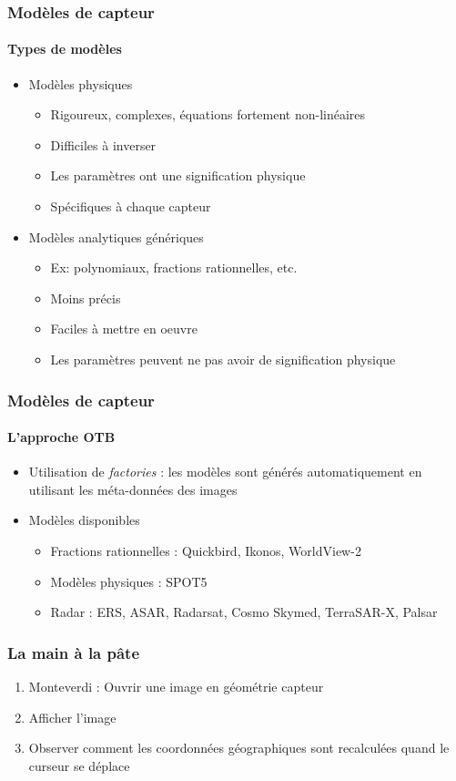 \documentclass[compress]{beamer}
\begin{document}
\begin{frame}
  \frametitle{Modèles de capteur}

  \framesubtitle{Types de modèles}
  \begin{itemize}
    \item Modèles physiques
      \begin{itemize}
	\item Rigoureux, complexes, équations fortement non-linéaires
	\item Difficiles à inverser
	\item Les paramètres ont une signification physique
	\item Spécifiques à chaque capteur
      \end{itemize}
    \item Modèles analytiques génériques
      \begin{itemize}
	\item Ex: polynomiaux, fractions rationnelles, etc.
	\item Moins précis
	\item Faciles à mettre en oeuvre
	\item Les paramètres peuvent ne pas avoir de signification physique
      \end{itemize}
  \end{itemize}

\end{frame}

\begin{frame}
  \frametitle{Modèles de capteur}

  \framesubtitle{L'approche OTB}
  \begin{itemize}
    \item Utilisation de {\em factories} : les modèles sont générés
      automatiquement en utilisant les méta-données des images
    \item Modèles disponibles
      \begin{itemize}
	\item Fractions rationnelles : Quickbird, Ikonos, WorldView-2
	\item Modèles physiques : SPOT5
	\item Radar : ERS, ASAR, Radarsat, Cosmo Skymed, TerraSAR-X, Palsar
      \end{itemize}
  \end{itemize}
\end{frame}


\begin{frame}
\frametitle{La main à la pâte}
\begin{enumerate}
\item Monteverdi : Ouvrir une image en géométrie capteur
\item Afficher l'image
\item Observer comment les coordonnées géographiques sont recalculées
  quand le curseur se déplace
\end{enumerate}
\end{frame}
\end{document}
